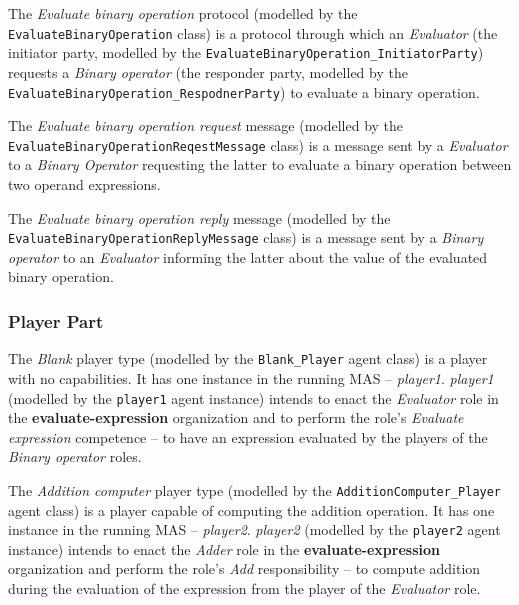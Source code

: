 The \textit{Evaluate binary operation} protocol (modelled by the \texttt{EvaluateBinaryOperation} class) is a protocol through which an \textit{Evaluator} (the initiator party, modelled by the \texttt{EvaluateBinaryOperation\_InitiatorParty}) requests a \textit{Binary operator} (the responder party, modelled by the \texttt{EvaluateBinaryOperation\_RespodnerParty}) to evaluate a binary operation.

The \textit{Evaluate binary operation request} message (modelled by the \texttt{EvaluateBinaryOperationReqestMessage} class) is a message sent by a \textit{Evaluator} to a \textit{Binary Operator} requesting the latter to evaluate a binary operation between two operand expressions.

The \textit{Evaluate binary operation reply} message (modelled by the \texttt{EvaluateBinaryOperationReplyMessage} class) is a message sent by a \textit{Binary operator} to an \textit{Evaluator} informing the latter about the value of the evaluated binary operation.

\subsubsection*{Player Part}

The \textit{Blank} player type (modelled by the \texttt{Blank\_Player} agent class) is a player with no capabilities.
It has one instance in the running MAS -- \textit{player1}.
\textit{player1} (modelled by the \texttt{player1} agent instance) intends to enact the \textit{Evaluator} role in the \textbf{evaluate-expression} organization and to perform the role's \textit{Evaluate expression} competence -- to have an expression evaluated by the players of the \textit{Binary operator} roles.

The \textit{Addition computer} player type (modelled by the \texttt{AdditionComputer\_Player} agent class) is a player capable of computing the addition operation.
It has one instance in the running MAS -- \textit{player2}.
\textit{player2} (modelled by the \texttt{player2} agent instance) intends to enact the \textit{Adder} role in the \textbf{evaluate-expression} organization and perform the role's \textit{Add} responsibility -- to compute addition during the evaluation of the expression from the player of the \textit{Evaluator} role.

